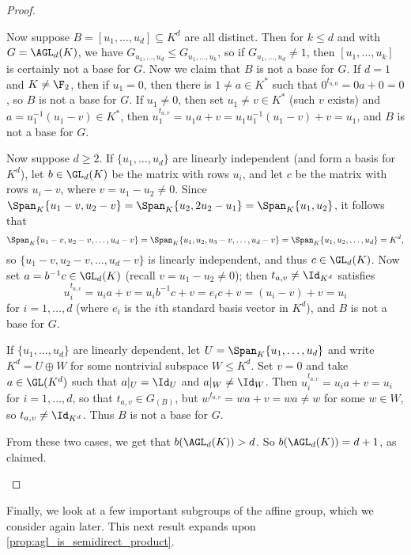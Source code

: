 \begin{proof}
\begin{enumerate}[(a)]
              Now suppose $B = [u_1,\dotsc,u_d] \subseteq K^d$ are all distinct. Then for $k \leq d$ and with $G = \AGL_d(K)$, we have $G_{u_1,\dotsc,u_d} \leq G_{u_1,\dotsc,u_k}$, so if $G_{u_1,\dotsc,u_d} \neq 1$, then $[u_1,\dotsc,u_k]$ is certainly not a base for $G$. Now we claim that $B$ is not a base for $G$. If $d = 1$ and $K \neq \F_2$, then if $u_1 = 0$, then there is $1 \neq a \in K^*$ such that $0^{t_{a,0}} = 0a + 0 = 0$, so $B$ is not a base for $G$. If $u_1 \neq 0$, then set $u_1 \neq v \in K^*$ (such $v$ exists) and $a = u_1^{-1}(u_1 - v) \in K^*$, then $u_1^{t_{a,v}} = u_1a + v = u_1u_1^{-1}(u_1 - v) + v = u_1$, and $B$ is not a base for $G$.

              Now suppose $d \geq 2$. If $\{u_1,\dotsc,u_d\}$ are linearly independent (and form a basis for $K^d$), let $b \in \GL_d(K)$ be the matrix with rows $u_i$, and let $c$ be the matrix with rows $u_i - v$, where $v = u_1 - u_2 \neq 0$. Since $\Span_K\{u_1 - v,u_2 - v\} = \Span_K\{u_2,2u_2 - u_1\} = \Span_K\{u_1,u_2\}$, it follows that
              $$\Span_K\{u_1 - v,u_2 - v,\dotsc,u_d - v\} = \Span_K\{u_1,u_2,u_3 - v,\dotsc,u_d - v\} = \Span_K\{u_1,u_2,\dotsc,u_d\} = K^d,$$
              so $\{u_1 - v,u_2 - v,\dotsc,u_d - v\}$ is linearly independent, and thus $c \in \GL_d(K)$. Now set $a = b^{-1}c \in \GL_d(K)$ (recall $v = u_1 - u_2 \neq 0$); then $t_{a,v} \neq \Id_{K^d}$ satisfies
              $$u_i^{t_{a,v}} = u_ia + v = u_ib^{-1}c + v = e_ic + v = (u_i - v) + v = u_i$$
              for $i = 1,\dotsc,d$ (where $e_i$ is the $i$th standard basis vector in $K^d$), and $B$ is not a base for $G$.

              If $\{u_1,\dotsc,u_d\}$ are linearly dependent, let $U = \Span_K\{u_1,\dotsc,u_d\}$ and write $K^d = U \oplus W$ for some nontrivial subspace $W \leq K^d$. Set $v = 0$ and take $a \in \GL(K^d)$ such that $a|_U = \Id_U$ and $a|_W \neq \Id_W$. Then $u_i^{t_{a,v}} = u_ia + v = u_i$ for $i = 1,\dotsc,d$, so that $t_{a,v} \in G_{(B)}$, but $w^{t_{a,v}} = wa + v = wa \neq w$ for some $w \in W$, so $t_{a,v} \neq \Id_{K^d}$. Thus $B$ is not a base for $G$.

              From these two cases, we get that $b(\AGL_d(K)) > d$. So $b(\AGL_d(K)) = d + 1$, as claimed.
    \end{enumerate}
\end{proof}

Finally, we look at a few important subgroups of the affine group, which we consider again later. This next result expands upon \autoref{prop:agl_is_semidirect_product}.

